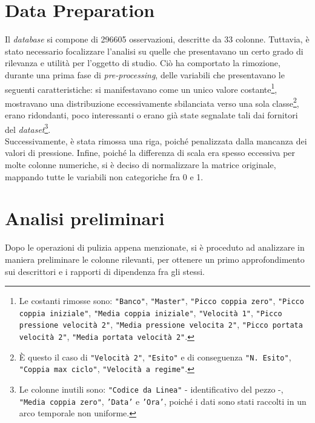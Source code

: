 \documentclass[fleqn,10pt]{SelfArx} %
\begin{document}
\section{Data Preparation}
Il \textit{database} si compone di 296605 osservazioni, descritte da 33 colonne. Tuttavia, è stato necessario focalizzare l'analisi su quelle che presentavano un certo grado di rilevanza e utilità per l'oggetto di studio. Ciò ha comportato la rimozione, durante una prima fase di \textit{pre-processing}, delle variabili che presentavano le seguenti caratteristiche: si manifestavano come un unico valore costante\footnote{Le costanti rimosse sono: \texttt{"Banco"}, \texttt{"Master"}, \texttt{"Picco coppia zero"}, \texttt{"Picco coppia iniziale"}, \texttt{"Media coppia iniziale"}, \texttt{"Velocità 1"}, \texttt{"Picco pressione velocità 2"}, \texttt{"Media pressione velocita 2"}, \texttt{"Picco portata velocità 2"}, \texttt{"Media portata velocità 2"}.}, mostravano una distribuzione eccessivamente sbilanciata verso una sola classe\footnote{È questo il caso di \texttt{"Velocità 2"}, \texttt{"Esito"} e di conseguenza \texttt{"N. Esito"}, \texttt{"Coppia max ciclo"}, \texttt{"Velocità a regime"}.}, erano ridondanti, poco interessanti o erano già state segnalate tali dai fornitori del \textit{dataset}\footnote{Le colonne inutili sono: \texttt{"Codice da Linea"} - identificativo del pezzo -, \texttt{"Media coppia zero"}, \texttt{'Data'} e \texttt{'Ora'}, poiché i dati sono stati raccolti in un arco temporale non uniforme.}.\\
Successivamente, è stata rimossa una riga, poiché penalizzata dalla mancanza dei valori di pressione. Infine, poiché la differenza di scala era spesso eccessiva per molte colonne numeriche, si è deciso di normalizzare la matrice originale, mappando tutte le variabili non categoriche fra 0 e 1. 
\section{Analisi preliminari}
Dopo le operazioni di pulizia appena menzionate, si è proceduto ad analizzare in maniera preliminare le colonne rilevanti, per ottenere un primo approfondimento sui descrittori e i rapporti di dipendenza fra gli stessi. 
\end{document}
